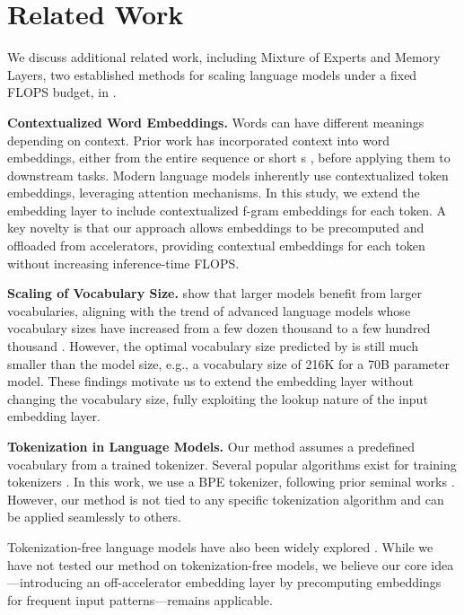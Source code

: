 \section{Related Work}\label{sec:related_work}

We discuss additional related work, including Mixture of Experts and Memory Layers, two established methods for scaling language models under a fixed FLOPS budget, in .


\smallskip\noindent\textbf{Contextualized Word Embeddings.} Words can have different meanings depending on context. Prior work has incorporated context into word embeddings, either from the entire sequence \citep{mccann2017learned,peters2018deep} or short s \citep{gupta2019better}, before applying them to downstream tasks. Modern language models inherently use contextualized token embeddings, leveraging attention mechanisms. In this study, we extend the embedding layer to include contextualized f-gram embeddings for each token. A key novelty is that our approach allows embeddings to be precomputed and offloaded from accelerators, providing contextual embeddings for each token without increasing inference-time FLOPS.

\smallskip\noindent\textbf{Scaling of Vocabulary Size.} \citet{tao2024scaling} show that larger models benefit from larger vocabularies, aligning with the trend of advanced language models whose vocabulary sizes have increased from a few dozen thousand \citep{devlin2019bert,radford2019language} to a few hundred thousand \citep{google2024gemma,adler2024nemotron,dubey2024llama,deepseek2024deepseek}. However, the optimal vocabulary size predicted by \citet{tao2024scaling} is still much smaller than the model size, e.g., a vocabulary size of 216K for a 70B  parameter model. These findings motivate us to extend the embedding layer without changing the vocabulary size, fully exploiting the lookup nature of the input embedding layer.

\smallskip\noindent\textbf{Tokenization in Language Models.} Our method assumes a predefined vocabulary from a trained tokenizer. Several popular algorithms exist for training tokenizers \citep{sennrich2015neural, wu2016google, kudo2018subword, kudo2018sentencepiece}. In this work, we use a BPE tokenizer, following prior seminal works \citep{radford2019language, touvron2023llama}. However, our method is not tied to any specific tokenization algorithm and can be applied seamlessly to others.

Tokenization-free language models have also been widely explored \citep{kim2016character, choe2019bridging, xue2022byt5, yu2023megabyte, wang2024mambabyte, deiseroth2024t, meta2024large, pagnoni2024byte}. While we have not tested our method on tokenization-free models, we believe our core idea—introducing an off-accelerator embedding layer by precomputing embeddings for frequent input patterns—remains applicable.


